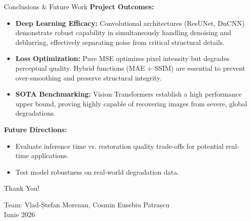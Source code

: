 \documentclass[10pt, handout]{beamer}
\begin{document}
\begin{frame}{Conclusions \& Future Work}
    \vspace{0.2cm}
    \textbf{Project Outcomes:}
    \begin{itemize}
        \item \textbf{Deep Learning Efficacy:} Convolutional architectures (ResUNet, DnCNN) demonstrate robust capability in simultaneously handling denoising and deblurring, effectively separating noise from critical structural details.
        \item \textbf{Loss Optimization:} Pure MSE optimizes pixel intensity but degrades perceptual quality. Hybrid functions (MAE + SSIM) are essential to prevent over-smoothing and preserve structural integrity.
        \item \textbf{SOTA Benchmarking:} Vision Transformers establish a high performance upper bound, proving highly capable of recovering images from severe, global degradations.
    \end{itemize}

    \vspace{0.4cm}
    \textbf{Future Directions:}
    \begin{itemize}
        \item Evaluate inference time vs. restoration quality trade-offs for potential real-time applications.
        \item Test model robustness on real-world degradation data.
    \end{itemize}
\end{frame}

\begin{frame}{}
    \centering
  
    \vspace{30pt}
    {\LARGE Thank You!}
    
    
    \vspace{20pt}
    \small Team: Vlad-Ștefan Moreanu, Cosmin Eusebiu Patrașcu \\ Iunie 2026
\end{frame}
\end{document}
